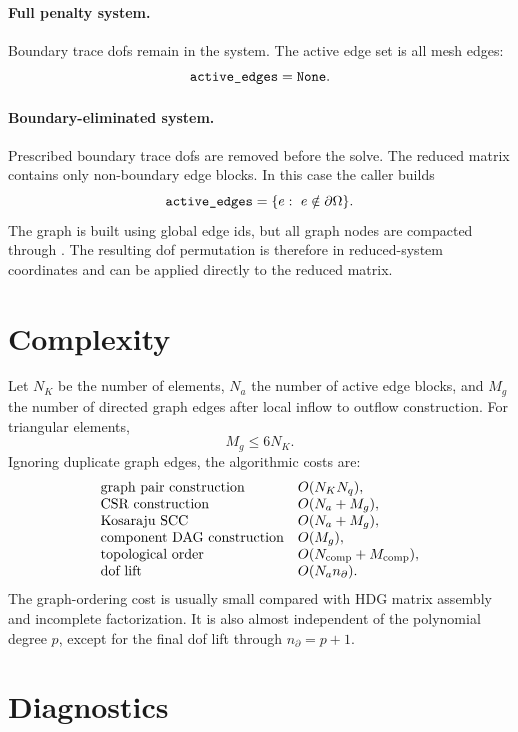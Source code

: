 \documentclass[11pt]{article}
\newcommand{\code}[1]{\texttt{\detokenize{#1}}}
\begin{document}
\paragraph{Full penalty system.}
Boundary trace dofs remain in the system.  The active edge set is all mesh
edges:
\[
  \code{active_edges} = \code{None}.
\]

\paragraph{Boundary-eliminated system.}
Prescribed boundary trace dofs are removed before the solve.  The reduced
matrix contains only non-boundary edge blocks.  In this case the caller builds
\[
  \code{active_edges} = \{e:\ e \notin \partial\Omega\}.
\]
The graph is built using global edge ids, but all graph nodes are compacted
through \code{old_to_active}.  The resulting dof permutation is therefore in
reduced-system coordinates and can be applied directly to the reduced matrix.

\section{Complexity}

Let \(N_K\) be the number of elements, \(N_a\) the number of active edge
blocks, and \(M_g\) the number of directed graph edges after local inflow to
outflow construction.  For triangular elements,
\[
  M_g \le 6N_K.
\]
Ignoring duplicate graph edges, the algorithmic costs are:
\[
\begin{array}{ll}
\text{graph pair construction} & O(N_K N_q),\\
\text{CSR construction} & O(N_a + M_g),\\
\text{Kosaraju SCC} & O(N_a + M_g),\\
\text{component DAG construction} & O(M_g),\\
\text{topological order} & O(N_{\rm comp}+M_{\rm comp}),\\
\text{dof lift} & O(N_a n_{\partial}).
\end{array}
\]
The graph-ordering cost is usually small compared with HDG matrix assembly and
incomplete factorization.  It is also almost independent of the polynomial
degree \(p\), except for the final dof lift through \(n_{\partial}=p+1\).

\section{Diagnostics}
\end{document}
